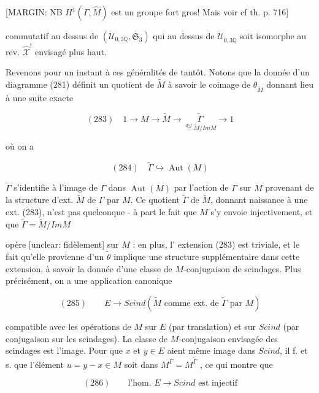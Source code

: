 [MARGIN: NB $H^1(\Gamma, \hat{M})$ est un groupe fort gros! Mais voir cf th. p. 716]

\newpage


commutatif au dessus de $(\mathcal{U}_{0,3\mathbb{Q}}, \mathfrak{S}_3)$
qui au dessus de $\mathcal{U}_{0,3\overline{\mathbb{Q}}}$ soit isomorphe
au rev. $\hat{\mathscr{X}}^!$ envisagé plus haut.

Revenons pour un instant à
ces généralités de tantôt. Notons que
la donnée d'un diagramme (281)
définit un quotient de $\tilde{M}$ à
savoir le coimage de $\theta_{\tilde{M}}$
donnant lieu à une suite
exacte

$$ (283) \quad 1 \longrightarrow M \longrightarrow \tilde{M} \longrightarrow \underset{\stackrel{def}{=} \tilde{M}/Im M}{\tilde{\Gamma}} \longrightarrow 1 $$

où on a

$$ (284) \quad \tilde{\Gamma} \hookrightarrow \operatorname{Aut}(M) $$

$\tilde{\Gamma}$ s'identifie à l'image de $\Gamma$ dans $\operatorname{Aut}(M)$
par l'action de $\Gamma$ sur $M$ provenant de
la structure d'ext. $\tilde{M}$ de $\Gamma$ par $M$.
Ce quotient $\tilde{\Gamma}$ de $\tilde{M}$, donnant
naissance à une ext. (283), n'est
pas quelconque - à part le fait que
$M$ s'y envoie injectivement, et que $\tilde{\Gamma} = \tilde{M}/Im M$

\newpage


opère [unclear: fidèlement] sur $M$ : en plus, l'
extension (283) est triviale, et le fait
qu'elle provienne d'un $\tilde{\theta}$ implique
une structure supplémentaire dans
cette extension, à savoir la donnée d'une
classe de $M$-conjugaison de scindages.
Plus précisément, on a une application
canonique

$$ (285) \qquad E \longrightarrow Scind(\tilde{M} \text{ comme ext. de } \tilde{\Gamma} \text{ par } M) $$

compatible avec les opérations de $M$
sur $E$ (par translation) et sur $Scind$
(par conjugaison sur les scindages).
La classe de $M$-conjugaison envisagée des scindages est l'image.
Pour que $x$ et $y \in E$ aient même image
dans $Scind$, il f. et s. que l'élément
$u = y-x \in M$ soit dans $M^\Gamma = M^{\tilde{\Gamma}}$ ,
ce qui montre que

$$ (286) \qquad \text{l'hom. } E \longrightarrow Scind \text{ est injectif} $$

